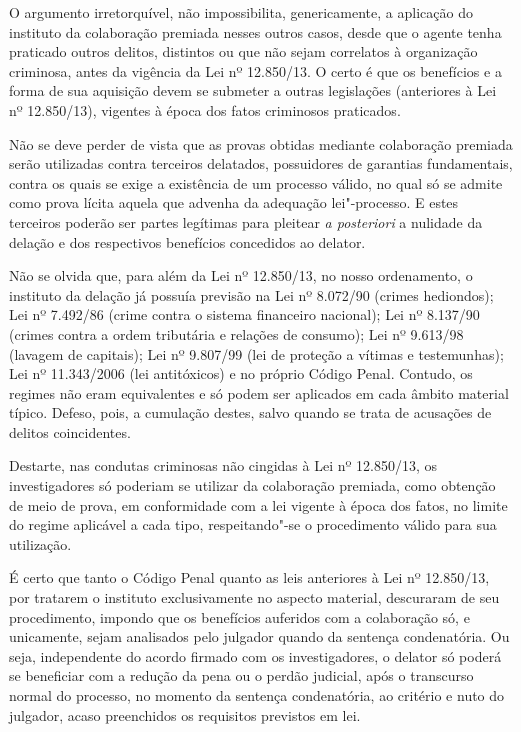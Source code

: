 O argumento irretorquível, não impossibilita, genericamente, a aplicação
do instituto da colaboração premiada nesses outros casos, desde que o
agente tenha praticado outros delitos, distintos ou que não sejam
correlatos à organização criminosa, antes da vigência da Lei nº
12.850/13. O certo é que os benefícios e a forma de sua aquisição devem
se submeter a outras legislações (anteriores à Lei nº 12.850/13),
vigentes à época dos fatos criminosos praticados.

Não se deve perder de vista que as provas obtidas mediante colaboração
premiada serão utilizadas contra terceiros delatados, possuidores de
garantias fundamentais, contra os quais se exige a existência de um
processo válido, no qual só se admite como prova lícita aquela que
advenha da adequação lei"-processo. E estes terceiros poderão ser partes
legítimas para pleitear \emph{a posteriori} a nulidade da delação e dos
respectivos benefícios concedidos ao delator.

Não se olvida que, para além da Lei nº 12.850/13, no nosso ordenamento,
o instituto da delação já possuía previsão na Lei nº 8.072/90 (crimes
hediondos); Lei nº 7.492/86 (crime contra o sistema financeiro
nacional); Lei nº 8.137/90 (crimes contra a ordem tributária e relações
de consumo); Lei nº 9.613/98 (lavagem de capitais); Lei nº 9.807/99 (lei
de proteção a vítimas e testemunhas); Lei nº 11.343/2006 (lei
antitóxicos) e no próprio Código Penal. Contudo, os regimes não eram
equivalentes e só podem ser aplicados em cada âmbito material típico.
Defeso, pois, a cumulação destes, salvo quando se trata de acusações de
delitos coincidentes.

Destarte, nas condutas criminosas não cingidas à Lei nº 12.850/13, os
investigadores só poderiam se utilizar da colaboração premiada, como
obtenção de meio de prova, em conformidade com a lei vigente à época dos
fatos, no limite do regime aplicável a cada tipo, respeitando"-se o
procedimento válido para sua utilização.

É certo que tanto o Código Penal quanto as leis anteriores à Lei nº
12.850/13, por tratarem o instituto exclusivamente no aspecto material,
descuraram de seu procedimento, impondo que os benefícios auferidos com
a colaboração só, e unicamente, sejam analisados pelo julgador quando da
sentença condenatória. Ou seja, independente do acordo firmado com os
investigadores, o delator só poderá se beneficiar com a redução da pena
ou o perdão judicial, após o transcurso normal do processo, no momento
da sentença condenatória, ao critério e nuto do julgador, acaso
preenchidos os requisitos previstos em lei.

